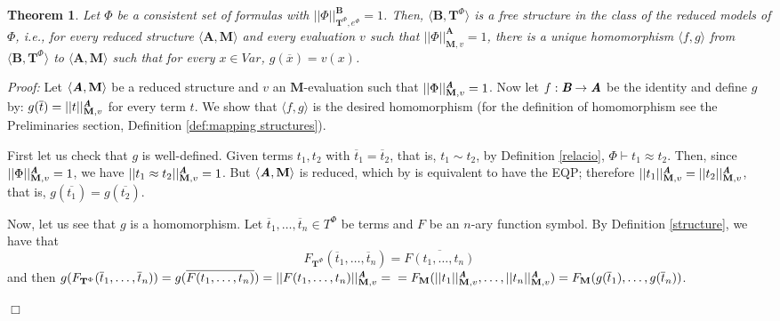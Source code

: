 \documentclass{IOS-Book-Article}
\newtheorem{theorem}{Theorem}
\newenvironment{proof}{ \noindent \textit{Proof:} }
{\hfill$\Box$\endtrivlist}
\begin{document}
\begin{theorem} \label{initial model}
Let $\Phi$ be a consistent set of formulas with $|| \Phi||^{\textbf{B}}_{\mathrm{\mathbf{T}}^{\Phi},e^{\Phi}}=1$. Then, $\langle\textbf{B},\mathrm{\mathbf{T}}^{\Phi}\rangle$ is a free structure in the class of the reduced models of $\Phi$, i.e., for every reduced structure $\langle\textbf{A},\mathrm{\mathbf{M}}\rangle$ and every evaluation $v$ such that $|| \Phi||^{\textbf{A}}_{\mathrm{\mathbf{M}},v}=1$, there is a unique homomorphism $\langle f,g\rangle$ from $\langle\textbf{B},\mathrm{\mathbf{T}}^{\Phi}\rangle$ to $\langle\textbf{A},\mathrm{\mathbf{M}}\rangle$ such that for every $x \in Var$, $g(\overline{x})=v(x)$.
 \end{theorem}

\begin{proof} Let $\langle\emph{\textbf{A}},\mathrm{\mathbf{M}}\rangle$ be a reduced structure and $v$ an $\textbf{M}$-evaluation such that $|| \Phi||^{\emph{\textbf{A}}}_{\mathrm{\mathbf{M}},v}=1$. Now let $f:\emph{\textbf{B}}\rightarrow\emph{\textbf{A}}$ be the identity and define $g$ by: $g(\overline{t})=|| t ||^{\emph{\textbf{A}}}_{\mathrm{\mathbf{M}},v}$ for every term $t$. We show that $\langle f,g\rangle$ is the desired homomorphism (for the definition of homomorphism see the Preliminaries section, Definition \ref{def:mapping structures}).

First let us check that $g$ is well-defined. Given terms $t_1,t_2$ with $\overline{t}_1=\overline{t}_2$, that is, $t_1\sim t_2$, by Definition \ref{relacio}, $\Phi\vdash t_1\approx t_2$. Then, since $|| \Phi||^{\emph{\textbf{A}}}_{\mathrm{\mathbf{M}},v}=1$, we have $|| t_1\approx t_2||^{\emph{\textbf{A}}}_{\mathrm{\mathbf{M}},v}=1$. But $\langle\emph{\textbf{A}},\mathrm{\mathbf{M}}\rangle$ is reduced, which by \cite[Lemma 20]{De12} is equivalent to have the EQP; therefore $|| t_1 ||^{\emph{\textbf{A}}}_{\mathrm{\mathbf{M}},v}=|| t_2||^{\emph{\textbf{A}}}_{\mathrm{\mathbf{M}},v}$, that is, $g(\overline{t_1})=g(\overline{t_2})$.

Now, let us see that $g$ is a homomorphism. Let $\overline{t}_1,\ldots,\overline{t}_n\in T^{\Phi}$ be terms and $F$ be an $n$-ary function symbol. By Definition \ref{structure}, we have that $$F_{\mathrm{\mathbf{T}}^{\Phi}}(\overline{t}_1,\ldots,\overline{t}_n)=\overline{F(t_1,\ldots,t_n)}$$ and then
$g(F_{\mathrm{\mathbf{T}}^{\Phi}}(\overline{t}_1,\ldots,\overline{t}_n))=g(\overline{F(t_1,\ldots,t_n)})=|| F(t_1,\ldots,t_n) ||^{\emph{\textbf{A}}}_{\mathrm{\mathbf{M}},v}= \newline =F_{\textbf{M}}(|| t_1||^{\emph{\textbf{A}}}_{\mathrm{\mathbf{M}},v},\ldots ,|| t_n ||^{\emph{\textbf{A}}}_{\mathrm{\mathbf{M}},v})= F_{\textbf{M}}(g(\overline{t}_1),\ldots,g(\overline{t}_n))$. 


\end{proof}
\end{document}
